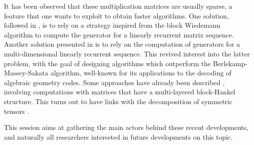 \documentclass[12pt,english]{article}
\begin{document}
It has been observed that these multiplication matrices are usually sparse, a
feature that one wants to exploit to obtain faster algorithms.  One solution,
followed in \cite{Steel15}, is to rely on a strategy inspired from the block
Wiedemann algorithm \cite{Coppersmith94,Villard97a} to compute the generator
for a linearly recurrent matrix sequence.  Another solution presented in
\cite{FaMo17} is to rely on the computation of generators for a
multi-dimensional linearly recurrent sequence.  This revived interest into the
latter problem, with the goal of designing algorithms which outperform the
Berlekamp-Massey-Sakata algorithm, well-known for its applications to the
decoding of algebraic geometry codes.  Some approaches have already been
described \cite{BerBoyFau17,Mourrain17}, involving computations with matrices
that have a multi-layered block-Hankel structure.  This turns out to have links
with the decomposition of symmetric tensors \cite{BrCoMots10}.

This session aims at gathering the main actors behind these recent
developments, and naturally all researchers interested in future developments
on this topic.





\end{document}
